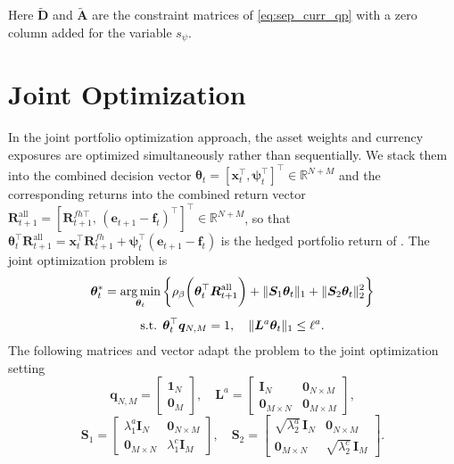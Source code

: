 Here $\tilde{\bm{D}}$ and $\tilde{\bm{A}}$ are the constraint matrices of \eqref{eq:sep_curr_qp} with a zero column
added for the variable $s_\psi$.

\section{Joint Optimization} \label{app:joint-optimization}

In the joint portfolio optimization approach, the asset weights and currency exposures are optimized
simultaneously rather than sequentially. We stack them into the combined decision vector
$\bm{\theta}_t = [\bm{x}_t^\top, \bm{\psi}_t^\top]^\top \in \mathbb{R}^{N+M}$ and the corresponding returns into the
combined return vector
$\bm{R}^{\text{all}}_{t+1} = [\bm{R}^{fh\top}_{t+1},\, (\bm{e}_{t+1} - \bm{f}_t)^\top]^\top \in \mathbb{R}^{N+M}$,
so that $\bm{\theta}_t^\top \bm{R}^{\text{all}}_{t+1} = \bm{x}_t^\top \bm{R}^{fh}_{t+1}
+ \bm{\psi}_t^\top (\bm{e}_{t+1} - \bm{f}_t)$ is the hedged portfolio return of .
The joint optimization problem is
\begin{equation} \label{eq:joint_obj}
\begin{gathered}
    \bm{\theta}_t^* = \operatorname*{arg\,min}_{\bm{\theta}_t} \left\{ \rho_\beta\biggl( \bm{\theta}_t^\top \bm{R}^{\text{all}}_{t+1} \biggr)
    + \|\bm{S}_1 \bm{\theta}_t\|_1 + \|\bm{S}_2 \bm{\theta}_t\|_2^2 \right\} \\[4pt]
    \text{s.t. } \bm{\theta}_t^\top \bm{q}_{N,M} = 1, \quad \|\bm{L}^a \bm{\theta}_t\|_1 \le \ell^a.
\end{gathered}
\end{equation}
The following matrices and vector adapt the problem to the
joint optimization setting
\begin{equation*}
    \bm{q}_{N,M} = \begin{bmatrix} \bm{1}_N \\ \bm{0}_M \end{bmatrix}, \quad
    \bm{L}^a = \begin{bmatrix} \bm{I}_N & \bm{0}_{N \times M} \\ \bm{0}_{M \times N} & \bm{0}_{M \times M} \end{bmatrix},
\end{equation*}
\begin{equation*}
    \bm{S}_1 = \begin{bmatrix} \lambda_1^a \bm{I}_N & \bm{0}_{N \times M} \\ \bm{0}_{M \times N} & \lambda_1^c \bm{I}_M \end{bmatrix}, \quad
    \bm{S}_2 = \begin{bmatrix} \sqrt{\lambda_2^a}\, \bm{I}_N & \bm{0}_{N \times M} \\ \bm{0}_{M \times N} & \sqrt{\lambda_2^c}\, \bm{I}_M \end{bmatrix}.
\end{equation*}
